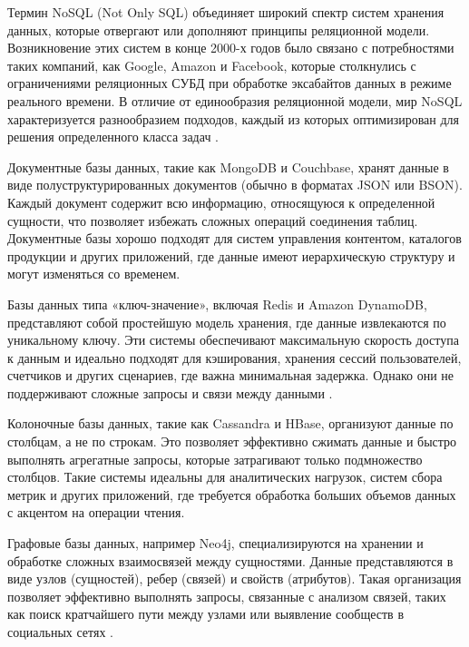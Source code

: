 \documentclass{SibFU-docs}
\begin{document}

Термин NoSQL (Not Only SQL) объединяет широкий спектр систем хранения данных, которые отвергают или дополняют принципы реляционной модели. Возникновение этих систем в конце 2000-х годов было связано с потребностями таких компаний, как Google, Amazon и Facebook, которые столкнулись с ограничениями реляционных СУБД при обработке эксабайтов данных в режиме реального времени. В отличие от единообразия реляционной модели, мир NoSQL характеризуется разнообразием подходов, каждый из которых оптимизирован для решения определенного класса задач \cite{sadalage2012}.

Документные базы данных, такие как MongoDB и Couchbase, хранят данные в виде полуструктурированных документов (обычно в форматах JSON или BSON). Каждый документ содержит всю информацию, относящуюся к определенной сущности, что позволяет избежать сложных операций соединения таблиц. Документные базы хорошо подходят для систем управления контентом, каталогов продукции и других приложений, где данные имеют иерархическую структуру и могут изменяться со временем.

Базы данных типа «ключ-значение», включая Redis и Amazon DynamoDB, представляют собой простейшую модель хранения, где данные извлекаются по уникальному ключу. Эти системы обеспечивают максимальную скорость доступа к данным и идеально подходят для кэширования, хранения сессий пользователей, счетчиков и других сценариев, где важна минимальная задержка. Однако они не поддерживают сложные запросы и связи между данными \cite{sadalage2012}.

Колоночные базы данных, такие как Cassandra и HBase, организуют данные по столбцам, а не по строкам. Это позволяет эффективно сжимать данные и быстро выполнять агрегатные запросы, которые затрагивают только подмножество столбцов. Такие системы идеальны для аналитических нагрузок, систем сбора метрик и других приложений, где требуется обработка больших объемов данных с акцентом на операции чтения.

Графовые базы данных, например Neo4j, специализируются на хранении и обработке сложных взаимосвязей между сущностями. Данные представляются в виде узлов (сущностей), ребер (связей) и свойств (атрибутов). Такая организация позволяет эффективно выполнять запросы, связанные с анализом связей, таких как поиск кратчайшего пути между узлами или выявление сообществ в социальных сетях \cite{sadalage2012}.

\end{document}
